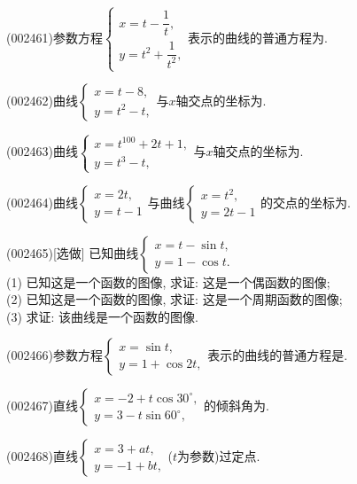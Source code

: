\item (002461)参数方程$\left\{\begin{array}{l}x=t-\dfrac{1}{t},\\y=t^2+\dfrac{1}{t^2},\end{array}\right.$表示的曲线的普通方程为.
\item (002462)曲线$\left\{\begin{array}{l}x=t-8,\\y=t^2-t,\end{array}\right.$与$x$轴交点的坐标为.
\item (002463)曲线$\left\{\begin{array}{l}x=t^{100}+2t+1,\\y=t^3-t,\end{array}\right.$与$x$轴交点的坐标为.
\item (002464)曲线$\left\{\begin{array}{l}x=2t,\\y=t-1\end{array}\right.$与曲线$\left\{\begin{array}{l}x=t^2,\\y=2t-1\end{array}\right.$的交点的坐标为.
\item (002465)[选做]
已知曲线$\left\{\begin{array}{l}x=t-\sin t,\\y=1-\cos t.\end{array}\right.$\\ 
(1) 已知这是一个函数的图像, 求证: 这是一个偶函数的图像;\\ 
(2) 已知这是一个函数的图像, 求证: 这是一个周期函数的图像;\\ 
(3) 求证: 该曲线是一个函数的图像.
\item (002466)参数方程$\left\{\begin{array}{l}x=\sin t,\\y=1+\cos 2t,\end{array}\right.$表示的曲线的普通方程是.
\item (002467)直线$\left\{\begin{array}{l}x=-2+t\cos 30^\circ,\\y=3-t\sin 60^\circ,\end{array}\right.$的倾斜角为.
\item (002468)直线$\left\{\begin{array}{l}x=3+at,\\y=-1+bt,\end{array}\right.$($t$为参数)过定点.
